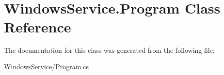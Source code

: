 \hypertarget{class_windows_service_1_1_program}{\section{Windows\-Service.\-Program Class Reference}
\label{class_windows_service_1_1_program}
}


The documentation for this class was generated from the following file\-:\begin{DoxyCompactItemize}
\item 
Windows\-Service/Program.\-cs\end{DoxyCompactItemize}
